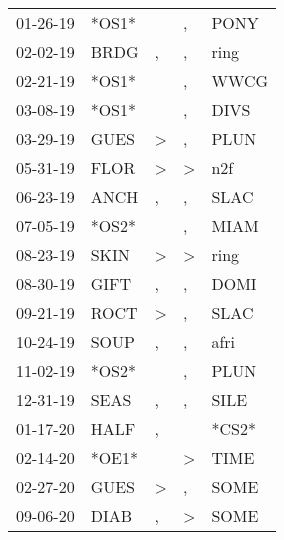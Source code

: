 \begin{supertabular}{p{0.07\textwidth}p{0.06\textwidth}p{0.02\textwidth}p{0.02\textwidth}p{0.06\textwidth}}
 01-26-19\textsuperscript{} &                   *OS1* &                  &             , &  PONY\textsuperscript{} \\
 02-02-19\textsuperscript{} &  BRDG\textsuperscript{} &                , &             , &  ring\textsuperscript{} \\
 02-21-19\textsuperscript{} &                   *OS1* &                  &             , &  WWCG\textsuperscript{} \\
 03-08-19\textsuperscript{} &                   *OS1* &                  &             , &  DIVS\textsuperscript{} \\
 03-29-19\textsuperscript{} &  GUES\textsuperscript{} &     \textgreater &             , &  PLUN\textsuperscript{} \\
 05-31-19\textsuperscript{} &  FLOR\textsuperscript{} &     \textgreater &  \textgreater &   n2f\textsuperscript{} \\
 06-23-19\textsuperscript{} &  ANCH\textsuperscript{} &                , &             , &  SLAC\textsuperscript{} \\
 07-05-19\textsuperscript{} &                   *OS2* &                  &             , &  MIAM\textsuperscript{} \\
 08-23-19\textsuperscript{} &  SKIN\textsuperscript{} &     \textgreater &  \textgreater &  ring\textsuperscript{} \\
 08-30-19\textsuperscript{} &  GIFT\textsuperscript{} &                , &             , &  DOMI\textsuperscript{} \\
 09-21-19\textsuperscript{} &  ROCT\textsuperscript{} &     \textgreater &             , &  SLAC\textsuperscript{} \\
 10-24-19\textsuperscript{} &  SOUP\textsuperscript{} &                , &             , &  afri\textsuperscript{} \\
 11-02-19\textsuperscript{} &                   *OS2* &                  &             , &  PLUN\textsuperscript{} \\
 12-31-19\textsuperscript{} &  SEAS\textsuperscript{} &                , &             , &  SILE\textsuperscript{} \\
 01-17-20\textsuperscript{} &  HALF\textsuperscript{} &                , &               &                   *CS2* \\
 02-14-20\textsuperscript{} &                   *OE1* &                  &  \textgreater &  TIME\textsuperscript{} \\
 02-27-20\textsuperscript{} &  GUES\textsuperscript{} &     \textgreater &             , &  SOME\textsuperscript{} \\
 09-06-20\textsuperscript{} &  DIAB\textsuperscript{} &                , &  \textgreater &  SOME\textsuperscript{} \\
\end{supertabular}
